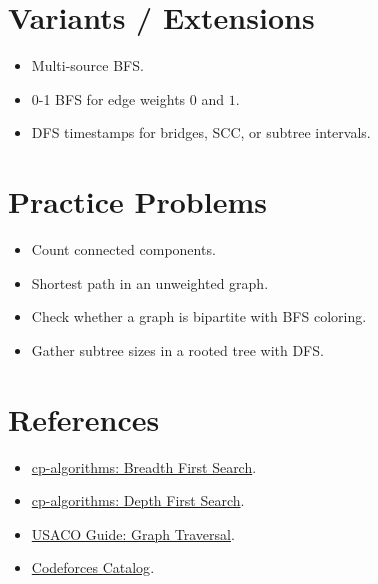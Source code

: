 \section*{Variants / Extensions}

\begin{itemize}
  \item Multi-source BFS.
  \item 0-1 BFS for edge weights \(0\) and \(1\).
  \item DFS timestamps for bridges, SCC, or subtree intervals.
\end{itemize}

\section*{Practice Problems}

\begin{itemize}
  \item Count connected components.
  \item Shortest path in an unweighted graph.
  \item Check whether a graph is bipartite with BFS coloring.
  \item Gather subtree sizes in a rooted tree with DFS.
\end{itemize}

\section*{References}

\begin{itemize}
  \item \href{https://cp-algorithms.com/graph/breadth-first-search.html}{cp-algorithms: Breadth First Search}.
  \item \href{https://cp-algorithms.com/graph/depth-first-search.html}{cp-algorithms: Depth First Search}.
  \item \href{https://usaco.guide/silver/graph-traversal}{USACO Guide: Graph Traversal}.
  \item \href{https://codeforces.com/catalog}{Codeforces Catalog}.
\end{itemize}
